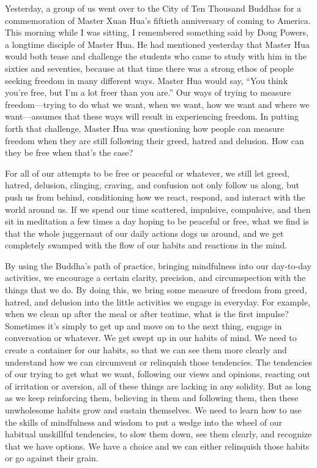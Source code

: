 
Yesterday, a group of us went over to the City of Ten Thousand Buddhas 
for a commemoration of Master Xuan Hua's fiftieth anniversary of coming 
to America. This morning while I was sitting, I remembered something 
said by Doug Powers, a longtime disciple of Master Hua. He had 
mentioned yesterday that Master Hua would both tease and challenge the 
students who came to study with him in the sixties and seventies, 
because at that time there was a strong ethos of people seeking freedom 
in many different ways. Master Hua would say, ``You think you're free, 
but I'm a lot freer than you are.'' Our ways of trying to measure 
freedom---trying to do what we want, when we want, how we want and 
where we want---assumes that these ways will result in experiencing 
freedom. In putting forth that challenge, Master Hua was questioning 
how people can measure freedom when they are still following their 
greed, hatred and delusion. How can they be free when that's the case?

For all of our attempts to be free or peaceful or whatever, we still 
let greed, hatred, delusion, clinging, craving, and confusion not only 
follow us along, but push us from behind, conditioning how we react, 
respond, and interact with the world around us. If we spend our time 
scattered, impulsive, compulsive, and then sit in meditation a few 
times a day hoping to be peaceful or free, what we find is that the 
whole juggernaut of our daily actions dogs us around, and we get 
completely swamped with the flow of our habits and reactions in the 
mind.

By using the Buddha's path of practice, bringing mindfulness into our 
day-to-day activities, we encourage a certain clarity, precision, and 
circumspection with the things that we do. By doing this, we bring some 
measure of freedom from greed, hatred, and delusion into the little 
activities we engage in everyday. For example, when we clean up after 
the meal or after teatime, what is the first impulse? Sometimes it's 
simply to get up and move on to the next thing, engage in conversation 
or whatever. We get swept up in our habits of mind. We need to create a 
container for our habits, so that we can see them more clearly and 
understand how we can circumvent or relinquish those tendencies. The 
tendencies of our trying to get what we want, following our views and 
opinions, reacting out of irritation or aversion, all of these things 
are lacking in any solidity. But as long as we keep reinforcing them, 
believing in them and following them, then these unwholesome habits 
grow and sustain themselves. We need to learn how to use the skills of 
mindfulness and wisdom to put a wedge into the wheel of our habitual 
unskillful tendencies, to slow them down, see them clearly, and 
recognize that we have options. We have a choice and we can either 
relinquish those habits or go against their grain.

